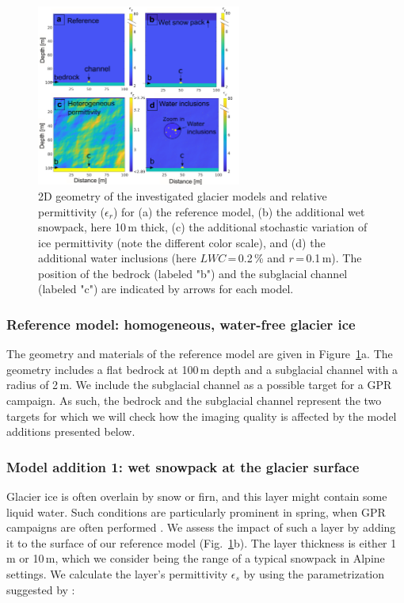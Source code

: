 \begin{figure}
    \centering
    \includegraphics[width=0.6\textwidth]{chapters/chapter_gprmax/Fig01.pdf}
    \caption{2D geometry of the investigated glacier models and relative permittivity ($\epsilon_r$) for (a) the reference model, (b) the additional wet snowpack, here 10\,m thick, (c) the additional stochastic variation of ice permittivity (note the different color scale), and (d) the additional water inclusions (here $LWC$\,=\,0.2\,\% and $r$\,=\,0.1\,m). The position of the bedrock (labeled "b") and the subglacial channel (labeled "c") are indicated by arrows for each model.}
    \label{fig:model_geometry}
\end{figure}


\subsubsection{Reference model: homogeneous, water-free glacier ice}
\label{sec:ref_model}

The geometry and materials of the reference model are given in Figure~\ref{fig:model_geometry}a. The geometry includes a flat bedrock at 100\,m depth and a subglacial channel with a radius of 2\,m. We include the subglacial channel as a possible target for a GPR campaign. As such, the bedrock and the subglacial channel represent the two targets for which we will check how the imaging quality is affected by the model additions presented below. 


\subsubsection{Model addition 1: wet snowpack at the glacier surface}
\label{sec:snow}

Glacier ice is often overlain by snow or firn, and this layer might contain some liquid water. Such conditions are particularly prominent in spring, when GPR campaigns are often performed \citep[e.g.][]{Bauder&al2018}. We assess the impact of such a layer by adding it to the surface of our reference model (Fig.~\ref{fig:model_geometry}b). The layer thickness is either 1\,m or 10\,m, which we consider being the range of a typical snowpack in Alpine settings. We calculate the layer's permittivity $\epsilon_s$ by using the parametrization suggested by \cite{Tiuri&al1984}: 

